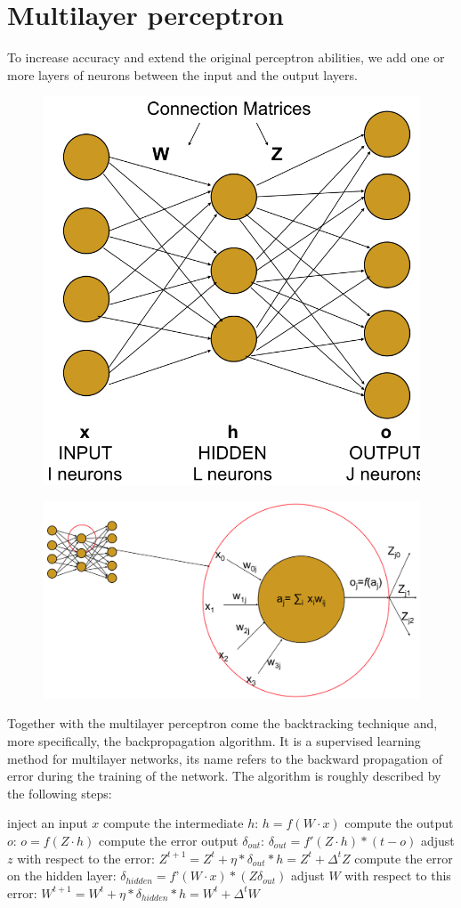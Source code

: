\section{Multilayer perceptron}
To increase accuracy and extend the original perceptron abilities, we add one or more layers of neurons between the input and the output layers.
\begin{figure}[h]
    \centering
    \includegraphics[width=0.35\linewidth]{img/multilayerperc}
\end{figure}
\begin{figure}[h]
    \centering
    \includegraphics[width=0.7\linewidth]{img/multilayerperc2}
\end{figure}
Together with the multilayer perceptron come the backtracking technique and, more specifically, the backpropagation algorithm. It is a supervised learning method for multilayer networks, its name refers to the backward propagation of error during the training of the network. The algorithm is roughly described by the following steps:
\begin{algorithm}[caption={Neural network backtracking (main loop).}, label={alg11}]
inject an input $x$
compute the intermediate $h$: $ h = f(W \cdot x)$
compute the output $o$: $o = f(Z \cdot h)$
compute the error output $\delta_{out}$: $\delta_{out} = f'(Z \cdot h) * (t - o)$
adjust $z$ with respect to the error: $Z^{t+1} = Z^t + \eta * \delta_{out} * h = Z^t + \Delta^t Z$  
compute the error on the hidden layer: $\delta_{hidden} = f’(W \cdot x) * (Z \delta_{out})$
adjust $W$ with respect to this error: $W^{t+1} = W^t + \eta * \delta_{hidden} * h = W^t + \Delta^t W$
\end{algorithm}
